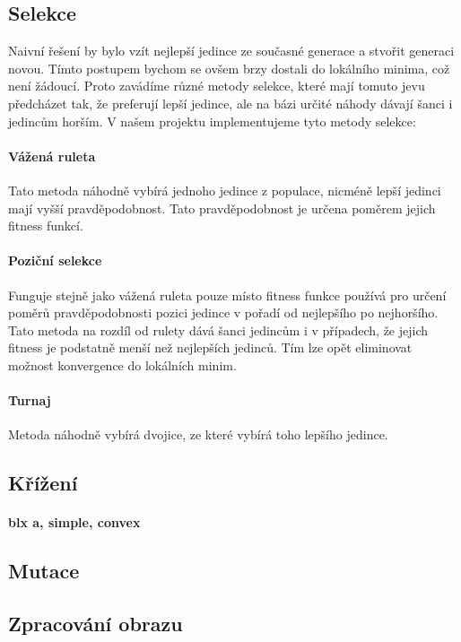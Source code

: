 \documentclass[a4paper,11pt]{scrartcl}
\begin{document}
\subsection{Selekce}
Naivní řešení by bylo vzít nejlepší jedince ze současné generace a stvořit generaci novou. Tímto postupem bychom se ovšem brzy dostali do lokálního minima, což není žádoucí. Proto zavádíme různé metody selekce, které mají tomuto jevu předcházet tak, že preferují lepší jedince, ale na bázi určité náhody dávají šanci i jedincům horším. V našem projektu implementujeme tyto metody selekce:

\paragraph{Vážená ruleta}
Tato metoda náhodně vybírá jednoho jedince z populace, nicméně lepší jedinci mají vyšší pravděpodobnost. Tato pravděpodobnost je určena poměrem jejich fitness funkcí.

\paragraph{Poziční selekce}
Funguje stejně jako vážená ruleta pouze místo fitness funkce používá pro určení poměrů pravděpodobnosti pozici jedince v pořadí od nejlepšího po nejhoršího. Tato metoda na rozdíl od rulety dává šanci jedincům i v případech, že jejich fitness je podstatně menší než nejlepších jedinců. Tím lze opět eliminovat možnost konvergence do lokálních minim.

\paragraph{Turnaj}
Metoda náhodně vybírá dvojice, ze které vybírá toho lepšího jedince.

\subsection{Křížení}

\paragraph{blx a, simple, convex}

\subsection{Mutace}

\subsection{Zpracování obrazu}
\end{document}
